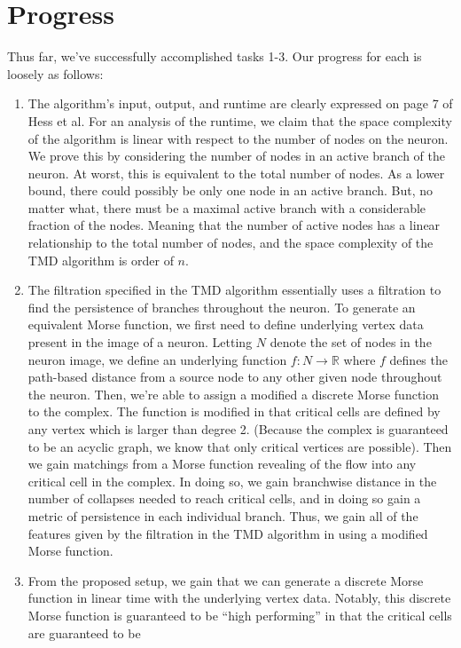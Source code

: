 \documentclass[11pt]{article}
\begin{document}
\section*{Progress}
Thus far, we've successfully accomplished tasks 1-3. Our progress for each is loosely as follows:
\begin{enumerate}
	\item The algorithm's input, output, and runtime are clearly expressed on page 7 of Hess et al. For an analysis
		of the runtime, we claim that the space complexity of the algorithm is linear with respect to the number
		of nodes on the neuron. We prove this by considering the number of nodes in an active branch of the neuron.
		At worst, this is equivalent to the total number of nodes. As a lower bound, there could possibly be only one
		node in an active branch. But, no matter what, there must be a maximal active branch with a considerable fraction
		of the nodes. Meaning that the number of active nodes has a linear relationship to the total number of nodes, and
		the space complexity of the TMD algorithm is order of $n$.
	\item The filtration specified in the TMD algorithm essentially uses a filtration to find the persistence of branches
		throughout the neuron. To generate an equivalent Morse function, we first need to define underlying vertex data
		present in the image of a neuron. Letting $N$ denote the set of nodes in the neuron image, we define an underlying
		function $f:N \rightarrow \mathbb{R}$ where $f$ defines the path-based distance from a source node to any other given
		node throughout the neuron. Then, we're able to assign a modified a discrete Morse function to the complex. The function
		is modified in that critical cells are defined by any vertex which is larger than degree 2. (Because the complex is guaranteed
		to be an acyclic graph, we know that only critical vertices are possible). Then we gain matchings from a Morse function revealing
		of the flow into any critical cell in the complex. In doing so, we gain branchwise distance in the number of collapses needed to
		reach critical cells, and in doing so gain a metric of persistence in each individual branch. Thus, we gain all of the features
		given by the filtration in the TMD algorithm in using a modified Morse function.
	\item From the proposed setup, we gain that we can generate a discrete Morse function in linear time with the underlying vertex data.
		Notably, this discrete Morse function is guaranteed to be ``high performing'' in that the critical cells are guaranteed to be

\end{enumerate}
\end{document}
